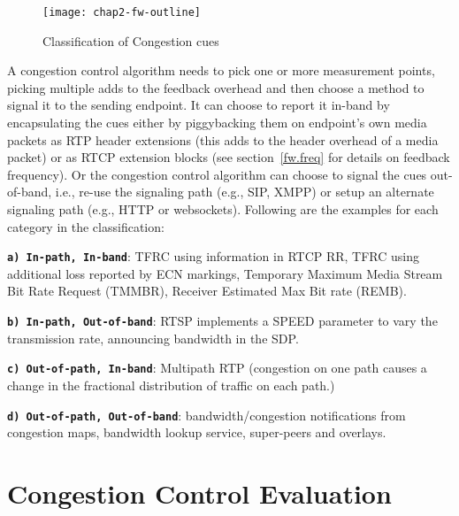 \begin{figure}[!h]
\texttt{[image: chap2-fw-outline]}
\caption{Classification of Congestion cues~\cite{Singh:PhDFw}}
\label{fig:4:fw}
\end{figure}

A congestion control algorithm needs to pick one or more measurement points,
picking multiple adds to the feedback overhead and then choose a method to
signal it to the sending endpoint. It can choose to report it in-band by
encapsulating the cues either by piggybacking them on endpoint's own media
packets as RTP header extensions (this adds to the header overhead of a media
packet) or as RTCP extension blocks (see section~\ref{fw.freq} for details on
feedback frequency). Or the congestion control algorithm can choose to signal
the cues out-of-band, i.e., re-use the signaling path (e.g., SIP, XMPP) or
setup an alternate signaling path (e.g., HTTP or websockets). Following are
the examples for each category in the classification:

\textbf{\texttt{a) In-path, In-band}}: TFRC using information in RTCP RR, TFRC
using additional loss reported by ECN markings, Temporary Maximum Media Stream
Bit Rate Request (TMMBR), Receiver Estimated Max Bit rate (REMB).

\textbf{\texttt{b) In-path, Out-of-band}}: RTSP implements a SPEED parameter
to vary the transmission rate, announcing bandwidth in the SDP.

\textbf{\texttt{c) Out-of-path, In-band}}: Multipath RTP (congestion on one
path causes a change in the fractional distribution of traffic on each path.)

\textbf{\texttt{d) Out-of-path, Out-of-band}}: bandwidth/congestion
notifications from congestion maps, bandwidth lookup service, super-peers and
overlays.




\section{Congestion Control Evaluation}
\label{fw.cc.eval}

